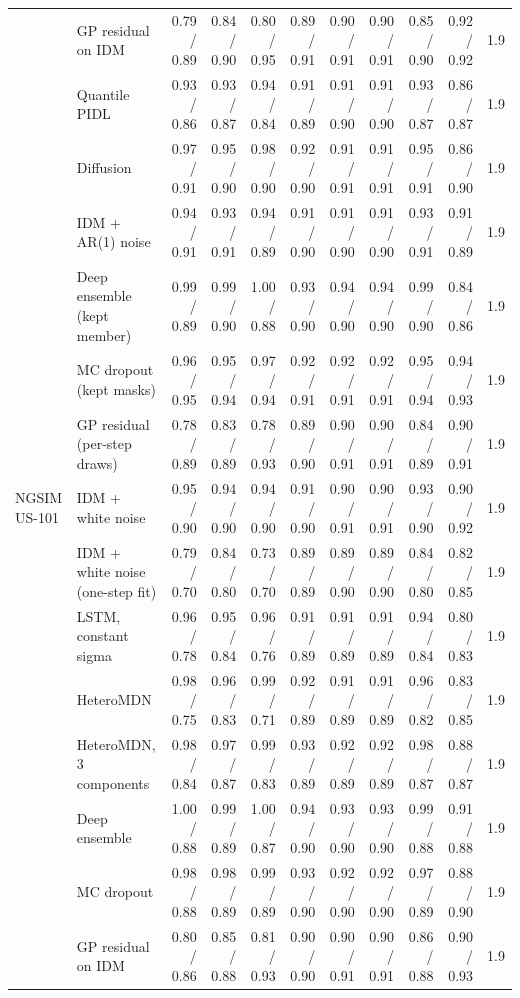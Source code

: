\begin{longtable}{llrrrrrrrrr}
 & GP residual on IDM & 0.79 / 0.89 & 0.84 / 0.90 & 0.80 / 0.95 & 0.89 / 0.91 & 0.90 / 0.91 & 0.90 / 0.91 & 0.85 / 0.90 & 0.92 / 0.92 & 1.9 \\
 & Quantile PIDL & 0.93 / 0.86 & 0.93 / 0.87 & 0.94 / 0.84 & 0.91 / 0.89 & 0.91 / 0.90 & 0.91 / 0.90 & 0.93 / 0.87 & 0.86 / 0.87 & 1.9 \\
 & Diffusion & 0.97 / 0.91 & 0.95 / 0.90 & 0.98 / 0.90 & 0.92 / 0.90 & 0.91 / 0.91 & 0.91 / 0.91 & 0.95 / 0.91 & 0.86 / 0.90 & 1.9 \\
 & IDM + AR(1) noise & 0.94 / 0.91 & 0.93 / 0.91 & 0.94 / 0.89 & 0.91 / 0.90 & 0.91 / 0.90 & 0.91 / 0.90 & 0.93 / 0.91 & 0.91 / 0.89 & 1.9 \\
 & Deep ensemble (kept member) & 0.99 / 0.89 & 0.99 / 0.90 & 1.00 / 0.88 & 0.93 / 0.90 & 0.94 / 0.90 & 0.94 / 0.90 & 0.99 / 0.90 & 0.84 / 0.86 & 1.9 \\
 & MC dropout (kept masks) & 0.96 / 0.95 & 0.95 / 0.94 & 0.97 / 0.94 & 0.92 / 0.91 & 0.92 / 0.91 & 0.92 / 0.91 & 0.95 / 0.94 & 0.94 / 0.93 & 1.9 \\
 & GP residual (per-step draws) & 0.78 / 0.89 & 0.83 / 0.89 & 0.78 / 0.93 & 0.89 / 0.90 & 0.90 / 0.91 & 0.90 / 0.91 & 0.84 / 0.89 & 0.90 / 0.91 & 1.9 \\
\midrule
NGSIM US-101 & IDM + white noise & 0.95 / 0.90 & 0.94 / 0.90 & 0.94 / 0.90 & 0.91 / 0.90 & 0.90 / 0.91 & 0.90 / 0.91 & 0.93 / 0.90 & 0.90 / 0.92 & 1.9 \\
 & IDM + white noise (one-step fit) & 0.79 / 0.70 & 0.84 / 0.80 & 0.73 / 0.70 & 0.89 / 0.89 & 0.89 / 0.90 & 0.89 / 0.90 & 0.84 / 0.80 & 0.82 / 0.85 & 1.9 \\
 & LSTM, constant sigma & 0.96 / 0.78 & 0.95 / 0.84 & 0.96 / 0.76 & 0.91 / 0.89 & 0.91 / 0.89 & 0.91 / 0.89 & 0.94 / 0.84 & 0.80 / 0.83 & 1.9 \\
 & HeteroMDN & 0.98 / 0.75 & 0.96 / 0.83 & 0.99 / 0.71 & 0.92 / 0.89 & 0.91 / 0.89 & 0.91 / 0.89 & 0.96 / 0.82 & 0.83 / 0.85 & 1.9 \\
 & HeteroMDN, 3 components & 0.98 / 0.84 & 0.97 / 0.87 & 0.99 / 0.83 & 0.93 / 0.89 & 0.92 / 0.89 & 0.92 / 0.89 & 0.98 / 0.87 & 0.88 / 0.87 & 1.9 \\
 & Deep ensemble & 1.00 / 0.88 & 0.99 / 0.89 & 1.00 / 0.87 & 0.94 / 0.90 & 0.93 / 0.90 & 0.93 / 0.90 & 0.99 / 0.88 & 0.91 / 0.88 & 1.9 \\
 & MC dropout & 0.98 / 0.88 & 0.98 / 0.89 & 0.99 / 0.89 & 0.93 / 0.90 & 0.92 / 0.90 & 0.92 / 0.90 & 0.97 / 0.89 & 0.88 / 0.90 & 1.9 \\
 & GP residual on IDM & 0.80 / 0.86 & 0.85 / 0.88 & 0.81 / 0.93 & 0.90 / 0.90 & 0.90 / 0.91 & 0.90 / 0.91 & 0.86 / 0.88 & 0.90 / 0.93 & 1.9 \\

\end{longtable}
